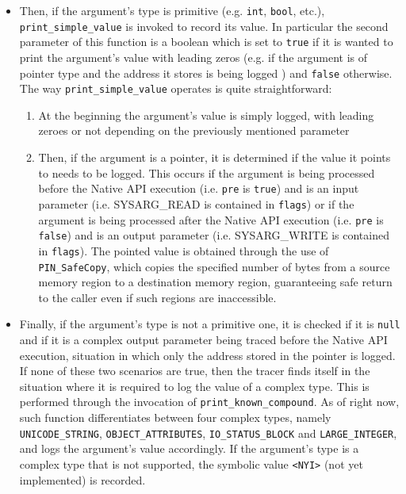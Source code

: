 \begin{itemize}
\item Then, if the argument's type is primitive (e.g. \texttt{int}, \texttt{bool}, etc.),  \texttt{print\_simple\_value} is invoked to record its value. In particular the second parameter of this function is a boolean which is set to \texttt{true} if it is wanted to print the argument's value with leading zeros (e.g. if the argument is of pointer type and the address it stores is being logged ) and \texttt{false} otherwise. The way \texttt{print\_simple\_value} operates is quite straightforward:
\begin{enumerate}
\item At the beginning the argument's value is simply logged, with leading zeroes or not depending on the previously mentioned parameter
\item Then, if the argument is a pointer, it is determined if the value it points to needs to be logged. This occurs if the argument is being processed before the Native API execution (i.e. \texttt{pre} is \texttt{true}) and is an input parameter (i.e. SYSARG\_READ is contained in \texttt{flags}) or if the argument is being processed after the Native API execution (i.e. \texttt{pre} is \texttt{false}) and is an output parameter (i.e. SYSARG\_WRITE is contained in \texttt{flags}). The pointed value is obtained through the use of \texttt{PIN\_SafeCopy}, which copies the specified number of bytes from a source memory region to a destination memory region, guaranteeing safe return to the caller even if such regions are inaccessible.  
\end{enumerate}      

\item Finally, if the argument's type is not a primitive one, it is checked if it is \texttt{null} and if it is a complex output parameter being traced before the Native API execution, situation in which only the address stored in the pointer is logged. If none of these two scenarios are true, then the tracer finds itself in the situation where it is required to log the value of a complex type. This is performed through the invocation of \texttt{print\_known\_compound}. As of right now, such function differentiates between four complex types, namely \texttt{UNICODE\_STRING}, \texttt{OBJECT\_ATTRIBUTES}, \texttt{IO\_STATUS\_BLOCK} and \texttt{LARGE\_INTEGER}, and logs the argument's value accordingly. If the argument's type is a complex type that is not supported, the symbolic value \texttt{<NYI>} (not yet implemented) is recorded.    

\end{itemize}

